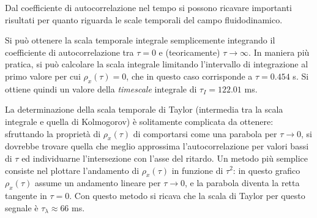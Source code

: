 \documentclass{article} %
\begin{document}
Dal coefficiente di autocorrelazione nel tempo si possono ricavare importanti risultati per quanto riguarda le scale temporali del campo fluidodinamico.\par
Si può ottenere la scala temporale integrale semplicemente integrando il coefficiente di autocorrelazione tra $\tau = 0$ e (teoricamente) $\tau \to \infty$. In maniera più pratica, si può calcolare la scala integrale limitando l'intervallo di integrazione al primo valore per cui $\rho_{x}(\tau) = 0$, che in questo caso corrisponde a $\tau = 0.454$ s. Si ottiene quindi un valore della \textit{timescale} integrale di $\tau_I = 122.01$ ms.\par
La determinazione della scala temporale di Taylor (intermedia tra la scala integrale e quella di Kolmogorov) è solitamente complicata da ottenere: sfruttando la proprietà di $\rho_{x}(\tau)$ di comportarsi come una parabola per $\tau \to 0$, si dovrebbe trovare quella che meglio approssima l'autocorrelazione per valori bassi di $\tau$ ed individuarne l'intersezione con l'asse del ritardo. Un metodo più semplice consiste nel plottare l'andamento di $\rho_x(\tau)$ in funzione di $\tau^2$: in questo grafico $\rho_x(\tau)$ assume un andamento lineare per $\tau \to 0$, e la parabola diventa la retta tangente in $\tau = 0$. Con questo metodo si ricava che la scala di Taylor per questo segnale è $\tau_\lambda \approx 66$ ms.
\newpage
\end{document}
